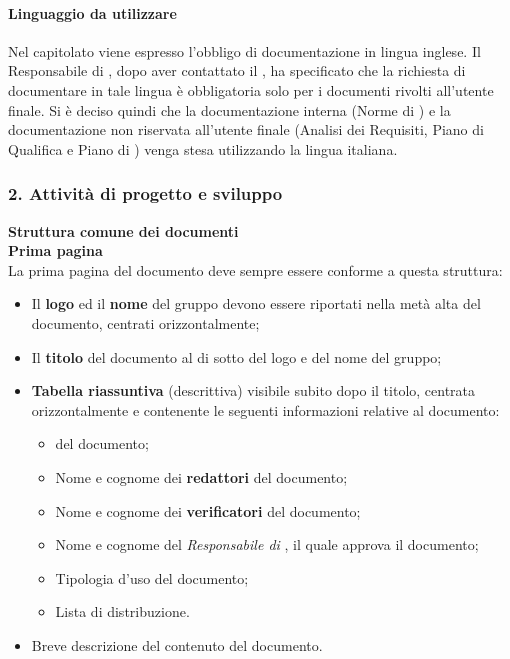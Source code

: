   \paragraph*{Linguaggio da utilizzare}
  Nel capitolato viene espresso l'obbligo di documentazione in lingua inglese. Il Responsabile di , dopo aver contattato il , ha specificato che la richiesta di documentare in tale lingua è obbligatoria solo per i documenti rivolti all'utente finale. Si è deciso quindi che la documentazione interna (Norme di ) e la documentazione non riservata all'utente finale (Analisi dei Requisiti, Piano di Qualifica e Piano di ) venga stesa utilizzando la lingua italiana.  





\subsubsection{2. Attivit\`a di progetto e sviluppo}   %
  \textbf{Struttura comune dei documenti} \\
      \textbf{Prima pagina} \\   
      La prima pagina del documento deve sempre essere conforme a questa struttura:
      \begin{itemize}
      \item Il \textbf{logo} ed il \textbf{nome} del gruppo devono essere riportati nella metà alta del documento, centrati orizzontalmente;
      \item Il \textbf{titolo} del documento al di sotto del logo e del nome del gruppo;
      \item \textbf{Tabella riassuntiva} (descrittiva) visibile subito dopo il titolo, centrata orizzontalmente e contenente
		le seguenti informazioni relative al documento:
        \begin{itemize}
        \item {} del documento;
        \item Nome e cognome dei \textbf{redattori} del documento;
        \item Nome e cognome dei \textbf{verificatori} del documento;
        \item Nome e cognome del \textit{Responsabile di }, il quale approva il documento;
        \item Tipologia d'uso del documento;
        \item Lista di distribuzione.
        \end{itemize}
    \item Breve descrizione del contenuto del documento.
      \end{itemize}

